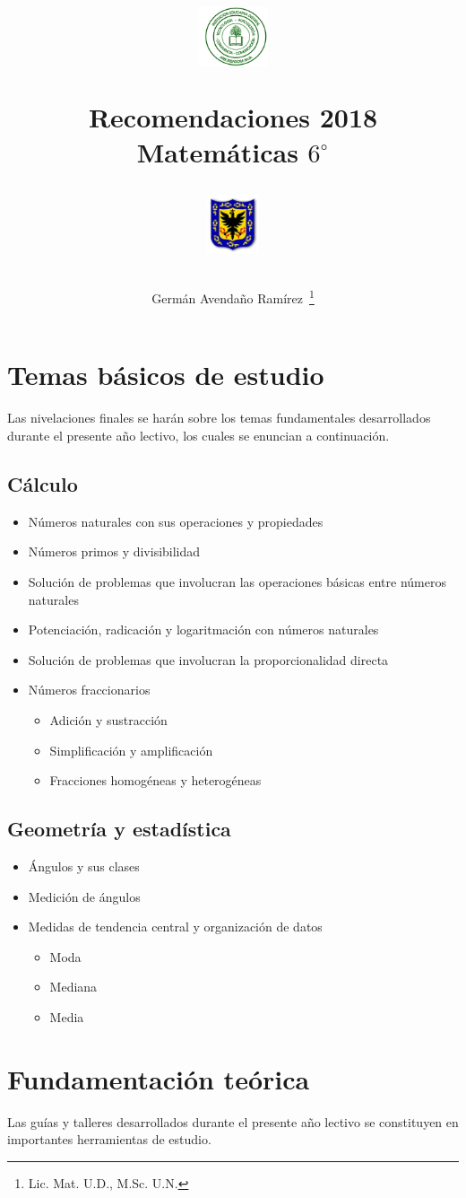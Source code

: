 \documentclass[letterpaper,11pt,twoside]{article}
\author{Germ\'an Avenda\~no Ram\'irez~\thanks{Lic. Mat. U.D., M.Sc. U.N.}}
\title{\begin{minipage}{.2\textwidth}
\includegraphics[height=1.75cm]{Images/logo-colegio.png}\end{minipage}
\begin{minipage}{.55\textwidth}
\begin{center}
Recomendaciones 2018\\
Matemáticas $6^{\circ}$
\end{center}
\end{minipage}\hfill
\begin{minipage}{.2\textwidth}
\includegraphics[height=1.75cm]{Images/logo-sed.png} 
\end{minipage}}
\date{}
\begin{document}
\maketitle
\section*{Temas básicos de estudio}
Las nivelaciones finales se harán sobre los temas fundamentales desarrollados durante el presente año lectivo, los cuales se enuncian a continuación.
\subsection*{Cálculo}
\begin{itemize}
\item Números naturales con sus operaciones y propiedades
\item Números primos y divisibilidad
\item Solución de problemas que involucran las operaciones básicas entre números naturales
\item Potenciación, radicación y logaritmación con números naturales
\item Solución de problemas que involucran la proporcionalidad directa 
\item Números fraccionarios
\begin{itemize}
\item Adición y sustracción
\item Simplificación y amplificación
\item Fracciones homogéneas y heterogéneas
\end{itemize}
\end{itemize}
\subsection*{Geometría y estadística}
\begin{itemize}
\item Ángulos y sus clases
\item Medición de ángulos
\item Medidas de tendencia central y organización de datos
\begin{itemize}
\item Moda
\item Mediana
\item Media
\end{itemize}
\end{itemize}
\section*{Fundamentación teórica}
Las guías y talleres desarrollados durante el presente año lectivo se constituyen en importantes herramientas de estudio.
\end{document}
